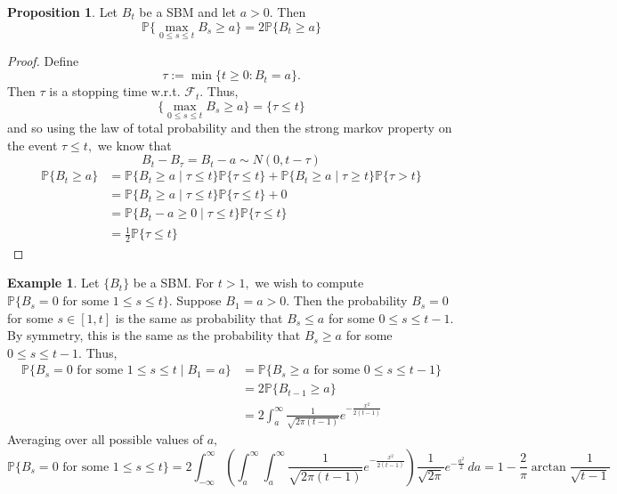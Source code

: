 \documentclass[10pt, oneside]{article}
\newcommand{\bbP}{\mathbb{P}}
\theoremstyle{definition}
\newtheorem{exmp}{Example}[section]
\newtheorem{prop}{Proposition}
\begin{document}
\begin{prop}
    Let $B_t$ be a SBM and let $a >0.$ Then 
    \[\bbP\{\max_{0 \leq s \leq t}B_s \geq a\} = 2\bbP\{B_t \geq a\}\]
\end{prop}
\begin{proof}
    Define 
    \[\tau:= \min\{t\geq 0 : B_t = a\}.\] Then $\tau$ is a stopping time w.r.t. $\mathcal{F}_t.$ Thus, 
    \[\{\max_{0\leq s\leq t}B_s \geq a\} = \{\tau \leq t\}\] and so using the law of total probability and then the strong markov property on the event $\tau \leq t,$ we know that 
    \[B_t - B_\tau = B_t - a \sim N(0, t - \tau)\]
    \begin{align*}
        \bbP\{B_t \geq a\} &= \bbP\{B_t \geq a \mid \tau \leq t\}\bbP\{\tau \leq t\} + \bbP\{B_t \geq a \mid \tau \geq t\}\bbP\{\tau >t\}\\
        &= \bbP\{B_t \geq a \mid \tau \leq t\}\bbP\{\tau \leq t\} + 0\\
        &= \bbP\{B_t - a \geq 0 \mid \tau \leq t\}\bbP\{\tau \leq t\}\\
        &= \frac{1}{2} \bbP\{\tau \leq t\}
    \end{align*}
\end{proof}

\begin{exmp}
    Let $\{B_t\}$ be a SBM. For $t>1,$ we wish to compute $\bbP\{B_s = 0 \text{ for some } 1\leq s \leq t\}.$ Suppose $B_1 = a >0.$ Then the probability $B_s = 0$ for some $s \in [1,t]$ is the same as probability that $B_s \leq a$ for some $0\leq s \leq t-1.$ By symmetry, this is the same as the probability that $B_s \geq a$ for some $0\leq s \leq t-1.$ Thus, 
    \begin{align*}
    \bbP\{B_s = 0 \text{ for some } 1 \leq s \leq t \mid B_1 = a\}&= \bbP\{B_s \geq a \text{ for some $0\leq s \leq t-1$}\}\\ &= 2\bbP\{B_{t-1} \geq a\}\\
    &= 2\int_a^\infty \frac{1}{\sqrt{2\pi (t-1)}}e^{-\frac{x^2}{2(t-1)}}
    \end{align*}
    Averaging over all possible values of $a,$ 
    \[\bbP\{B_s = 0\text{ for some } 1\leq s \leq t\} = 2\int_{-\infty}^\infty \left(\int_a^\infty \int_a^\infty \frac{1}{\sqrt{2\pi (t-1)}}e^{-\frac{x^2}{2(t-1)}}\right) \frac{1}{\sqrt{2\pi} }e^{-\frac{a^2}{2}}\,da = 1 - \frac{2}{\pi}\arctan \frac{1}{\sqrt{t-1}}\]
    
\end{exmp}
\end{document}
